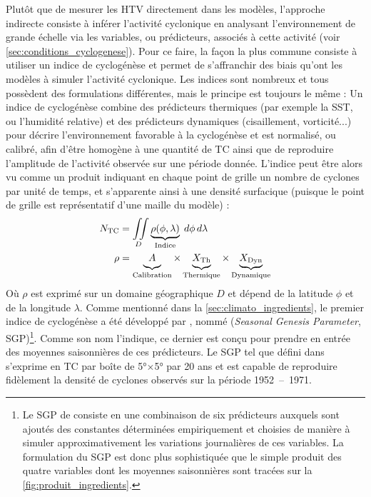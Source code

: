 \documentclass[../main.tex]{subfiles}
\begin{document}
Plutôt que de mesurer les HTV directement dans les modèles, l'approche indirecte consiste à inférer l'activité cyclonique en analysant l'environnement de grande
échelle via les variables, ou prédicteurs, associés à cette activité (voir \cref{sec:conditions_cyclogenese}). Pour ce faire, la façon la plus commune consiste
à utiliser un indice de cyclogénèse \parencite{gray_tropical_1975} et permet de s'affranchir des biais qu'ont les modèles à simuler l'activité cyclonique. Les
indices sont nombreux et tous possèdent des formulations différentes, mais le principe est toujours le même : Un indice de cyclogénèse combine des prédicteurs
thermiques (par exemple la SST, ou l'humidité relative) et des prédicteurs dynamiques (cisaillement, vorticité...) pour décrire l'environnement favorable à la
cyclogénèse et est normalisé, ou calibré, afin d'être homogène à une quantité de TC ainsi que de reproduire l'amplitude de l'activité observée sur une
période donnée. L'indice peut être alors vu comme un produit indiquant en chaque point de grille un nombre de cyclones par unité de temps, et s'apparente ainsi
à une densité surfacique (puisque le point de grille est représentatif d'une maille du modèle) :
%
\begin{align*}
    N_{\text{TC}} &= \iint\limits_{D} \underbrace{\rho(\phi, \lambda)}_{\text{Indice}} \; d\phi \, d\lambda \\
    \rho &= \underbrace{\vphantom{X_{\text{Dyn}}}A}_{\text{Calibration}} \times \underbrace{\vphantom{X_{\text{Dyn}}}X_{\text{Th}}}_{\text{Thermique}} \times
    \underbrace{X_{\text{Dyn}}}_{\text{Dynamique}}
\end{align*}
%
Où $\rho$ est exprimé sur un domaine géographique $D$ et dépend de la latitude $\phi$ et de la longitude $\lambda$. Comme mentionné dans la
\cref{sec:climato_ingredients}, le premier indice de cyclogénèse a été développé par \textcite{gray_tropical_1975}, nommé  (\textit{Seasonal Genesis Parameter}, SGP)\footnote{Le SGP de \textcite{gray_tropical_1975} consiste en une combinaison de six prédicteurs auxquels
sont ajoutés des constantes déterminées empiriquement et choisies de manière à simuler approximativement les variations journalières de ces variables.
La formulation du SGP est donc plus sophistiquée que le simple produit des quatre variables dont les moyennes saisonnières sont tracées sur la
\cref{fig:produit_ingredients}.}. Comme son nom l'indique, ce dernier est conçu pour prendre en entrée des moyennes saisonnières de ces prédicteurs. Le SGP
tel que défini dans \textcite{gray_tropical_1975} s'exprime en TC par boîte de \ang{5}$\times$\ang{5} par 20 ans et est capable de reproduire fidèlement la
densité de cyclones observés sur la période \num{1952}~--~\num{1971}.
\end{document}
